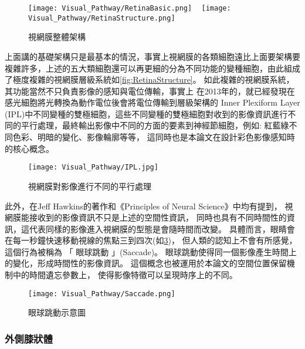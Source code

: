 \documentclass[class=NCU_thesis, crop=false]{standalone}
\begin{document}
\begin{figure}[H]
  \centering
    {\texttt{[image: Visual\_Pathway/RetinaBasic.png]}
    }
~
    {\texttt{[image: Visual\_Pathway/RetinaStructure.png]}
    }
  \caption{視網膜整體架構}
  \label{fig:RetinaTotalStructure}
\end{figure}

上面講的基礎架構只是最基本的情況，事實上視網膜的各類細胞遠比上面要架構要複雜許多，上述的五大類細胞還可以再更細的分為不同功能的變種細胞，由此組成了極度複雜的視網膜層級系統如\cref{fig:RetinaStructure}。
如此複雜的視網膜系統，其功能當然不只負責影像的感知與電位傳輸，事實上
在2013年的\cite{annurev}，就已經發現在感光細胞將光轉換為動作電位後會將電位傳輸到層級架構的 Inner Plexiform Layer (IPL)中不同變種的雙極細胞，這些不同變種的雙極細胞對收到的影像資訊進行不同的平行處理，最終輸出影像中不同的方面的要素到神經節細胞，例如: 紅藍綠不同色彩、明暗的變化、影像輪廓等等， 這同時也是本論文在設計彩色影像感知時的核心概念。

\begin{figure}[H]
  \centering
  \texttt{[image: Visual\_Pathway/IPL.jpg]}
  \caption{視網膜對影像進行不同的平行處理~\cite{annurev}}
  \label{fig:IPL}
\end{figure}
\pagebreak

此外，在Jeff Hawkins的著作\cite{10.5555/993636}和《Principles of Neural Science》\cite{1180370208}中均有提到，
視網膜能接收到的影像資訊不只是上述的空間性資訊，
同時也具有不同時間性的資訊，這代表同樣的影像進入視網膜的型態是會隨時間而改變。
具體而言，眼睛會在每一秒鐘快速移動視線的焦點三到四次(如\cref{fig:Saccade})，
但人類的認知上不會有所感覺，這個行為被稱為 「 眼球跳動 」(Saccade)。
眼球跳動使得同一個影像產生時間上的變化，形成時間性的影像資訊。
這個概念也被運用於本論文的空間位置保留機制中的時間遺忘參數上，
使得影像特徵可以呈現時序上的不同。

\begin{figure}[H]
  \centering
  \texttt{[image: Visual\_Pathway/Saccade.png]}
  \caption{眼球跳動示意圖~\cite{annurev}}
  \label{fig:Saccade}
\end{figure}

\subsubsection{外側膝狀體}
\end{document}
